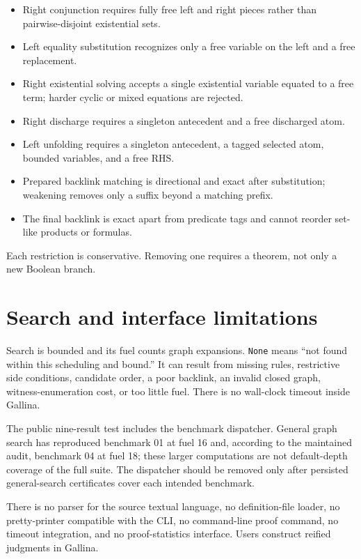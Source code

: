 \documentclass[11pt,oneside]{book}
\DeclareRobustCommand{\code}[1]{\nolinkurl{#1}}
\begin{document}
\begin{itemize}[leftmargin=*]
\item Right conjunction requires fully free left and right pieces rather than
pairwise-disjoint existential sets.
\item Left equality substitution recognizes only a free variable on the left
and a free replacement.
\item Right existential solving accepts a single existential variable equated
to a free term; harder cyclic or mixed equations are rejected.
\item Right discharge requires a singleton antecedent and a free discharged
atom.
\item Left unfolding requires a singleton antecedent, a tagged selected atom,
bounded variables, and a free RHS.
\item Prepared backlink matching is directional and exact after substitution;
weakening removes only a suffix beyond a matching prefix.
\item The final backlink is exact apart from predicate tags and cannot reorder
set-like products or formulas.
\end{itemize}

Each restriction is conservative.  Removing one requires a theorem, not only a
new Boolean branch.

\section{Search and interface limitations}

Search is bounded and its fuel counts graph expansions.  \code{None} means
``not found within this scheduling and bound.''  It can result from missing
rules, restrictive side conditions, candidate order, a poor backlink, an
invalid closed graph, witness-enumeration cost, or too little fuel.  There is no
wall-clock timeout inside Gallina.

The public nine-result test includes the benchmark dispatcher.  General graph
search has reproduced benchmark 01 at fuel 16 and, according to the maintained
audit, benchmark 04 at fuel 18; these larger computations are not default-depth
coverage of the full suite.  The dispatcher should be removed only after
persisted general-search certificates cover each intended benchmark.

There is no parser for the source textual language, no definition-file loader,
no pretty-printer compatible with the CLI, no command-line proof command, no
timeout integration, and no proof-statistics interface.  Users construct
reified judgments in Gallina.
\end{document}
